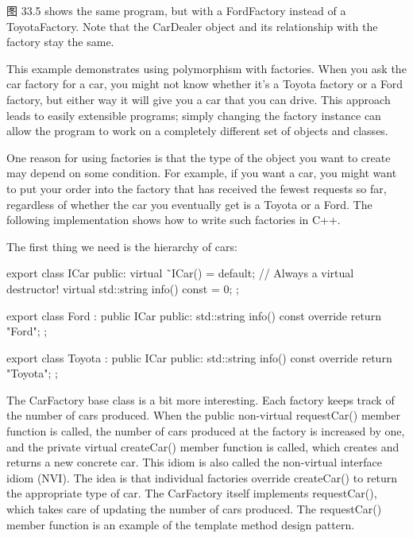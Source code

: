 
图 33.5 shows the same program, but with a FordFactory instead of a ToyotaFactory. Note that the CarDealer object and its relationship with the factory stay the same.


This example demonstrates using polymorphism with factories. When you ask the car factory for a car, you might not know whether it’s a Toyota factory or a Ford factory, but either way it will give you a car that you can drive. This approach leads to easily extensible programs; simply changing the factory instance can allow the program to work on a completely different set of objects and classes.


One reason for using factories is that the type of the object you want to create may depend on some condition. For example, if you want a car, you might want to put your order into the factory that has received the fewest requests so far, regardless of whether the car you eventually get is a Toyota or a Ford. The following implementation shows how to write such factories in C++.

The first thing we need is the hierarchy of cars:

\begin{cpp}
export class ICar
{
    public:
        virtual ˜ICar() = default; // Always a virtual destructor!
        virtual std::string info() const = 0;
};

export class Ford : public ICar
{
    public:
        std::string info() const override { return "Ford"; }
};

export class Toyota : public ICar
{
    public:
        std::string info() const override { return "Toyota"; }
};
\end{cpp}

The CarFactory base class is a bit more interesting. Each factory keeps track of the number of cars produced. When the public non-virtual requestCar() member function is called, the number of cars produced at the factory is increased by one, and the private virtual createCar() member function is called, which creates and returns a new concrete car. This idiom is also called the non-virtual interface idiom (NVI). The idea is that individual factories override createCar() to return the appropriate type of car. The CarFactory itself implements requestCar(), which takes care of updating the number of cars produced. The requestCar() member function is an example of the template method design pattern.

